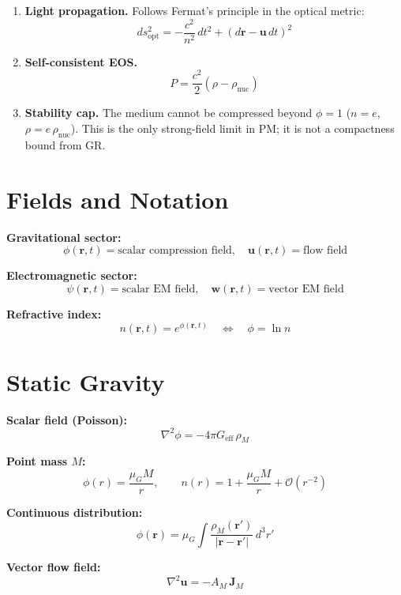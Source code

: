 \documentclass[10pt,twocolumn]{article}
\begin{document}
\begin{enumerate}
  \item \textbf{Light propagation.}
        Follows Fermat's principle in the optical metric:
        \[ ds_{\mathrm{opt}}^2 = -\frac{c^2}{n^2}\,dt^2
           + (d\mathbf{r} - \mathbf{u}\,dt)^2 \]

  \item \textbf{Self-consistent EOS.}
        \[ P = \frac{c^2}{2}\!\left(\rho - \rho_{\mathrm{nuc}}\right) \]

  \item \textbf{Stability cap.}
        The medium cannot be compressed beyond $\phi = 1$ ($n = e$,
        $\rho = e\,\rho_{\mathrm{nuc}}$).  This is the only strong-field limit
        in PM; it is not a compactness bound from GR.
\end{enumerate}

\section{Fields and Notation}

\textbf{Gravitational sector:}
\[
  \phi(\mathbf r,t) = \text{scalar compression field},\quad
  \mathbf u(\mathbf r,t) = \text{flow field}
\]

\textbf{Electromagnetic sector:}
\[
  \psi(\mathbf r,t) = \text{scalar EM field},\quad
  \mathbf w(\mathbf r,t) = \text{vector EM field}
\]

\textbf{Refractive index:}
\[
  \boxed{n(\mathbf r,t) = e^{\phi(\mathbf r,t)}}
  \quad\Longleftrightarrow\quad
  \phi = \ln n
\]

\section{Static Gravity}

\textbf{Scalar field (Poisson):}
\[
  \nabla^2 \phi = -4\pi G_{\mathrm{eff}}\,\rho_M
\]

\textbf{Point mass $M$:}
\[
  \phi(r) = \frac{\mu_G M}{r}, \qquad
  n(r) = 1 + \frac{\mu_G M}{r} + \mathcal{O}(r^{-2})
\]

\textbf{Continuous distribution:}
\[
  \phi(\mathbf r) = \mu_G \int \frac{\rho_M(\mathbf r')}{|\mathbf r - \mathbf r'|}\,d^3r'
\]

\textbf{Vector flow field:}
\[
  \nabla^2 \mathbf u = -A_M\,\mathbf J_M
\]
\end{document}
